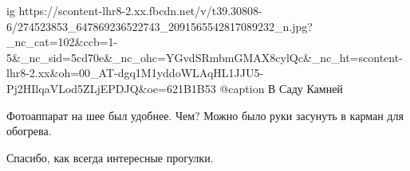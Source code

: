  
 
 
 
 

\ifcmt
  ig https://scontent-lhr8-2.xx.fbcdn.net/v/t39.30808-6/274523853_647869236522743_2091565542817089232_n.jpg?_nc_cat=102&ccb=1-5&_nc_sid=5cd70e&_nc_ohc=YGvdSRmbmGMAX8cylQc&_nc_ht=scontent-lhr8-2.xx&oh=00_AT-dgq1M1yddoWLAqHL1JJU5-Pj2HIlqaVLod5ZLjEPDJQ&oe=621B1B53
	@caption В Саду Камней
\fi


Фотоаппарат на шее был удобнее. Чем? Можно было руки засунуть в карман для
обогрева.

Спасибо, как всегда интересные прогулки.
